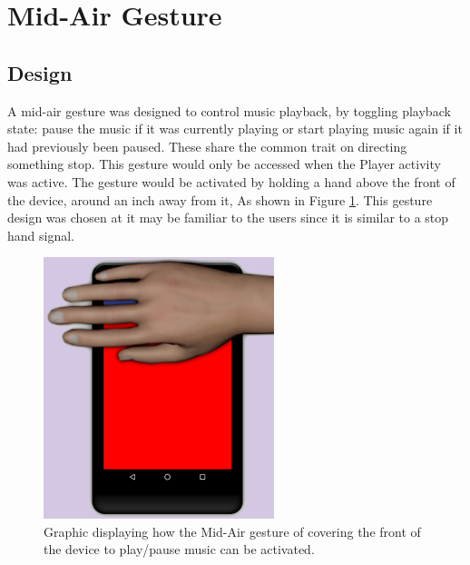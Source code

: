 \documentclass{l4proj}
\begin{document}
\section{Mid-Air Gesture}

\subsection{Design}
A mid-air gesture was designed to control music playback, by toggling playback state: pause the music if it was currently playing or start playing music again if it had previously been paused. These share the common trait on directing something stop. This gesture would only be accessed when the Player activity was active. The gesture would be activated by holding a hand above the front of the device, around an inch away from it, As shown in Figure \ref{fig:Mid-air}. This gesture design was chosen at it may be familiar to the users since it is similar to a stop hand signal.

\begin{figure}
    \centering
    \includegraphics[width=0.6\textwidth]{images/covering.png}
        \caption{Graphic displaying how the Mid-Air gesture of covering the front of the device to play/pause music can be activated.}
        \label{fig:Mid-air}
\end{figure}
\end{document}
